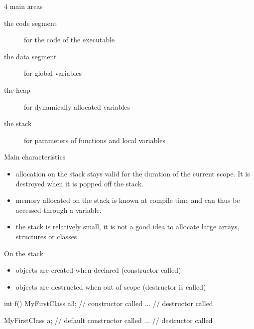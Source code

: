\begin{frame}[fragile]
  \begin{block}{4 main areas}
    \begin{description}
    \item[the code segment] for the code of the executable
    \item[the data segment] for global variables
    \item[the heap] for dynamically allocated variables
    \item[the stack] for parameters of functions and local variables
    \end{description}
  \end{block}
  \hspace{2.5cm}
\end{frame}

\begin{frame}[fragile]
  \begin{block}{Main characteristics}
    \begin{itemize}
    \item allocation on the stack stays valid for the duration of the current scope.
    It is destroyed when it is popped off the stack.
    \item memory allocated on the stack is known at compile time and can thus be accessed through a variable.
    \item the stack is relatively small, it is not a good idea to allocate large arrays, structures or classes
    \end{itemize}
  \end{block}
\end{frame}

\begin{frame}[fragile]
  \begin{block}{On the stack}
    \begin{itemize}
    \item objects are created when declared (constructor called)
    \item objects are destructed when out of scope (destructor is called)
    \end{itemize}
  \end{block}
  \begin{cppcode}
    int f() {
      MyFirstClass a{3}; // constructor called
      ...
    } // destructor called

    {
      MyFirstClass a; // default constructor called
      ...
    }  // destructor called
  \end{cppcode}
\end{frame}

